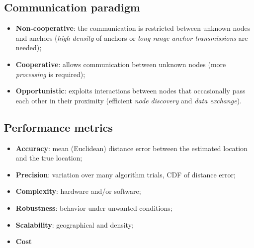 \documentclass[a4paper,12pt]{article}
\begin{document}
\subsection{Communication paradigm}
\begin{itemize}
  \item \textbf{Non-cooperative}: the communication is restricted between unknown nodes and anchors (\textit{high density} of anchors or \textit{long-range anchor transmissions} are needed);
  \item \textbf{Cooperative}: allows communication between unknown nodes (more \textit{processing} is required);
  \item \textbf{Opportunistic}: exploits interactions between nodes that occasionally pass each other in their proximity (efficient \textit{node discovery} and \textit{data exchange}).
\end{itemize}

\subsection{Performance metrics}
\begin{itemize}
  \item \textbf{Accuracy}: mean (Euclidean) distance error between the estimated location and the true location;
  \item \textbf{Precision}: variation over many algorithm trials, CDF of distance error;
  \item \textbf{Complexity}: hardware and/or software;
  \item \textbf{Robustness}: behavior under unwanted conditions;
  \item \textbf{Scalability}: geographical and density;
  \item \textbf{Cost}
\end{itemize}
\end{document}
